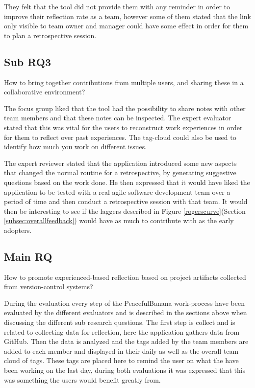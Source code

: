 They felt that the tool did not provide them with any reminder in order to improve their reflection rate as a team, however some of them stated that the link only visible to team owner and manager could have some effect in order for them to plan a retrospective session.

\subsection{Sub RQ3}
\noindent\makebox[\linewidth]{\rule{\textwidth}{0.5pt}} 

\begin{center}
How to bring together contributions from multiple users, and sharing these in a collaborative environment? \\
\end{center}

\noindent\makebox[\linewidth]{\rule{\textwidth}{0.5pt}}
The focus group liked that the tool had the possibility to share notes with other team members and that these notes can be inspected. The expert evaluator stated that this was vital for the users to reconstruct work experiences in order for them to reflect over past experiences. The tag-cloud could also be used to identify how much you work on different issues.

The expert reviewer stated that the application introduced some new aspects that changed the normal routine for a retrospective, by generating suggestive questions based on the work done. He then expressed that it would have liked the application to be tested with a real agile software development team over a period of time and then conduct a retrospective session with that team. It would then be interesting to see if the laggers described in Figure \ref{rogerscurve}(Section \ref{subsec:overallfeedback}) would have as much to contribute with as the early adopters.

\subsection{Main RQ}
\noindent\makebox[\linewidth]{\rule{\textwidth}{0.5pt}} 

\begin{center}
How to promote experienced-based reflection based on project artifacts collected from version-control systems? \\
\end{center}

\noindent\makebox[\linewidth]{\rule{\textwidth}{0.5pt}} 
During the evaluation every step of the PeacefulBanana work-process have been evaluated by the different evaluators and is described in the sections above when discussing the different sub research questions. The first step is collect and is related to collecting data for reflection, here the application gathers data from GitHub. Then the data is analyzed and the tags added by the team members are added to each member and displayed in their daily as well as the overall team cloud of tags. These tags are placed here to remind the user on what the have been working on the last day, during both evaluations it was expressed that this was something the users would benefit greatly from.

